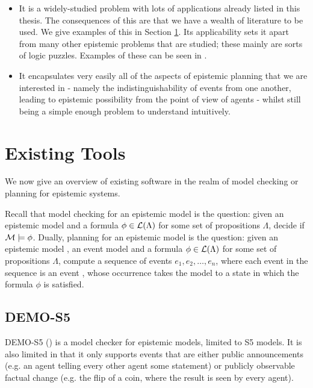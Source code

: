 \documentclass[10pt, a4paper]{report}
\begin{document}
\begin{itemize}
\item It is a widely-studied problem with lots of applications already listed in
  this thesis. The consequences of this are that we have a wealth of literature
  to be used. We give examples of this in Section \ref{sec:ExistingTools}. Its
  applicability sets it apart from many other epistemic problems that are
  studied; these mainly are sorts of logic puzzles. Examples of these can be
  seen in \cite{DEMO-S5}.
\item It encapsulates very easily all of the aspects of epistemic planning that
  we are interested in - namely the indistinguishability of events from one
  another, leading to epistemic possibility from the point of view of agents -
  whilst still being a simple enough problem to understand intuitively.  
\end{itemize}

\section{Existing Tools}
\label{sec:ExistingTools}

We now give an overview of existing software in the realm of model checking or
planning for epistemic systems.

Recall that model checking for an epistemic model is the question: given an
epistemic model  and a formula $\phi \in \mathcal{L}(\Lambda)$ for some set of
propositions $\Lambda$, decide if $\mathcal{M} \models \phi$. Dually, planning for an
epistemic model is the question: given an epistemic model , an event
model  and a formula $\phi \in \mathcal{L}(\Lambda)$ for some set of
propositions $\Lambda$, compute a sequence of events $e_1, e_2, \ldots, e_n$,
where each event in the sequence is an event , whose occurrence takes the
model  to a state in which the formula $\phi$ is satisfied. 

\subsection{DEMO-S5}

DEMO-S5 (\cite{DEMO-S5}) is a model checker for epistemic models, limited to
\textsf{S5} models. It is also limited in that it only supports events that are either
public announcements (e.g. an agent telling every other agent some statement) or
publicly observable factual change (e.g. the flip of a coin, where the result is
seen by every agent).
\end{document}
